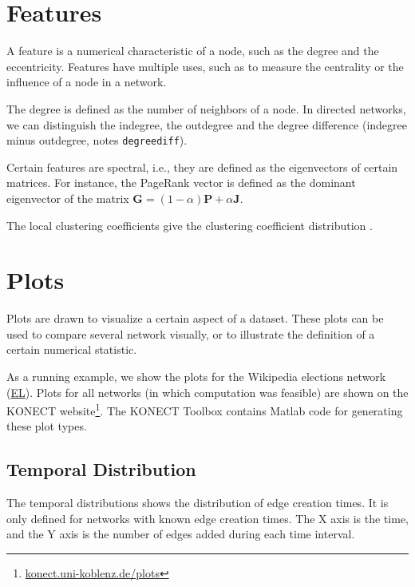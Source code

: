 \documentclass{article}
\begin{document}
\section{Features}
\label{sec:features}
A feature is a numerical characteristic of a node, such as the degree
and the eccentricity.  Features have multiple uses, such as to measure
the centrality or the influence of a node in a network. 

The degree is defined as the number 
of neighbors of a node.  In directed networks, we can distinguish the
indegree, the outdegree and the degree difference (indegree minus
outdegree, notes \texttt{degreediff}). 

Certain features are spectral, i.e., they are defined as the
eigenvectors of certain matrices.  For instance, the PageRank vector
 is defined as the dominant eigenvector of
the matrix $\mathbf G = (1-\alpha) \mathbf P + \alpha\mathbf J$. 

The local clustering coefficients give the clustering coefficient
distribution  \cite{b865}. 

\section{Plots}
\label{sec:plots}

Plots are drawn to visualize a certain aspect of a dataset. These plots
can be used to compare several network visually, or to illustrate the
definition of a certain numerical statistic.

As a running example, we show the plots for the Wikipedia elections
network
(\href{http://konect.uni-koblenz.de/networks/elec}{\textsf{EL}}).  Plots
for all networks (in which computation was feasible) are shown on the
KONECT
website\footnote{\href{http://konect.uni-koblenz.de/plots/}{konect.uni-koblenz.de/plots}}. The
KONECT Toolbox contains Matlab code for generating these plot types.

\subsection{Temporal Distribution}
The temporal distributions shows the distribution of edge creation
times.  It is only defined for networks with known edge creation times.
The X axis is the time, and the Y axis is the number of edges added
during each time interval.
\end{document}
